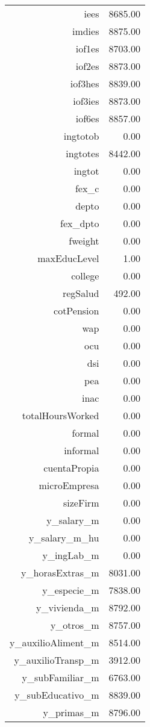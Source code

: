 \begin{table}[ht]
\begin{tabular}{rr}
  iees & 8685.00 \\ 
  imdies & 8875.00 \\ 
  iof1es & 8703.00 \\ 
  iof2es & 8873.00 \\ 
  iof3hes & 8839.00 \\ 
  iof3ies & 8873.00 \\ 
  iof6es & 8857.00 \\ 
  ingtotob & 0.00 \\ 
  ingtotes & 8442.00 \\ 
  ingtot & 0.00 \\ 
  fex\_c & 0.00 \\ 
  depto & 0.00 \\ 
  fex\_dpto & 0.00 \\ 
  fweight & 0.00 \\ 
  maxEducLevel & 1.00 \\ 
  college & 0.00 \\ 
  regSalud & 492.00 \\ 
  cotPension & 0.00 \\ 
  wap & 0.00 \\ 
  ocu & 0.00 \\ 
  dsi & 0.00 \\ 
  pea & 0.00 \\ 
  inac & 0.00 \\ 
  totalHoursWorked & 0.00 \\ 
  formal & 0.00 \\ 
  informal & 0.00 \\ 
  cuentaPropia & 0.00 \\ 
  microEmpresa & 0.00 \\ 
  sizeFirm & 0.00 \\ 
  y\_salary\_m & 0.00 \\ 
  y\_salary\_m\_hu & 0.00 \\ 
  y\_ingLab\_m & 0.00 \\ 
  y\_horasExtras\_m & 8031.00 \\ 
  y\_especie\_m & 7838.00 \\ 
  y\_vivienda\_m & 8792.00 \\ 
  y\_otros\_m & 8757.00 \\ 
  y\_auxilioAliment\_m & 8514.00 \\ 
  y\_auxilioTransp\_m & 3912.00 \\ 
  y\_subFamiliar\_m & 6763.00 \\ 
  y\_subEducativo\_m & 8839.00 \\ 
  y\_primas\_m & 8796.00 \\ 

\end{tabular}
\end{table}
